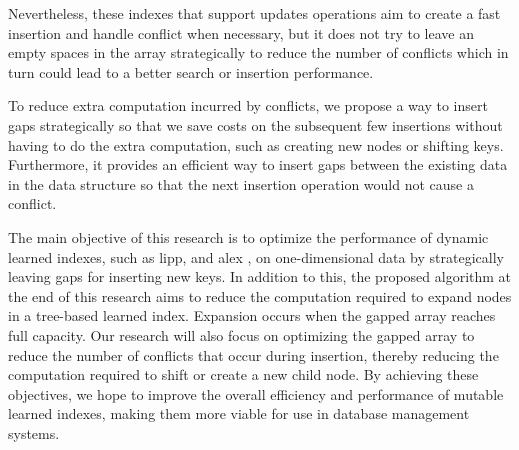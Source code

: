 Nevertheless, these indexes that support updates operations aim to create a fast insertion and handle conflict when necessary, but it does not try to leave an empty spaces in the array strategically to reduce the number of conflicts which in turn could lead to a better search or insertion performance\cite{ALEX,fittingtree,PGM,LIPP}.

To reduce extra computation incurred by conflicts, we propose a way to insert gaps strategically so that we save costs on the subsequent few insertions without having to do the extra computation, such as creating new nodes or shifting keys. Furthermore, it provides an efficient way to insert gaps between the existing data in the data structure so that the next insertion operation would not cause a conflict. 

The main objective of this research is to optimize the performance of dynamic learned indexes, such as  \acrshort{lipp}, and \acrshort{alex} , on one-dimensional data by strategically leaving gaps for inserting new keys. In addition to this, the proposed algorithm at the end of this research aims to reduce the computation required to expand nodes in a tree-based learned index. Expansion occurs when the gapped array reaches full capacity. Our research will also focus on optimizing the gapped array to reduce the number of conflicts that occur during insertion, thereby reducing the computation required to shift or create a new child node. By achieving these objectives, we hope to improve the overall efficiency and performance of mutable learned indexes, making them more viable for use in database management systems.
